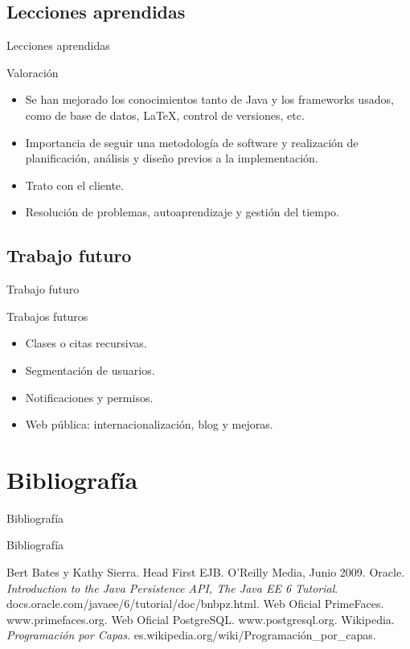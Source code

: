 \documentclass[spanish,xcolor=table,svgnames]{beamer}
\begin{document}
\subsection*{Lecciones aprendidas}
\begin{frame}{Lecciones aprendidas}
\begin{block}{Valoración}
  \begin{itemize}
    \item Se han mejorado los conocimientos tanto de Java y los frameworks usados, como de base de datos, \LaTeX, control de versiones, etc.
    \item Importancia de seguir una metodología de software y realización de planificación, análisis y diseño previos a la implementación.
    \item Trato con el cliente.
    \item Resolución de problemas, autoaprendizaje y gestión del tiempo.
  \end{itemize}
\end{block}
\end{frame}

\subsection*{Trabajo futuro}
\begin{frame}{Trabajo futuro}
\begin{block}{Trabajos futuros}
\begin{itemize}
\item Clases o citas recursivas.
\item Segmentación de usuarios.
\item Notificaciones y permisos.
\item Web pública: internacionalización, blog y mejoras.
\end{itemize}
\end{block}
\end{frame}

\section{Bibliografí­a}
\begin{frame}{Bibliografí­a}
  \tableofcontents[currentsection]
\end{frame}

\begin{frame}{Bibliografí­a}
  \begin{thebibliography}{10}
    \beamertemplatebookbibitems
     Bert Bates y Kathy Sierra. Head First EJB. O'Reilly Media, Junio 2009.
     Oracle. \emph{Introduction to the Java Persistence API, The Java EE 6 Tutorial}. docs.oracle.com/javaee/6/tutorial/doc/bnbpz.html.
     Web Oficial PrimeFaces. www.primefaces.org.
     Web Oficial PostgreSQL. www.postgresql.org.
     Wikipedia. \emph{Programación por Capas}. es.wikipedia.org/wiki/Programación\_por\_capas.
  \end{thebibliography} 
\end{frame}
\end{document}
